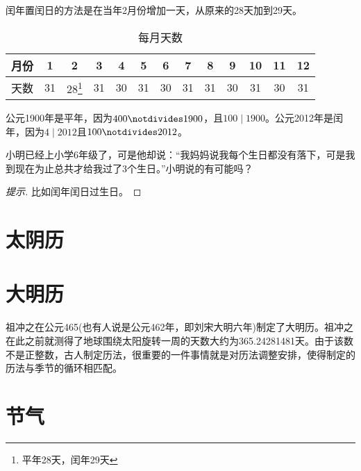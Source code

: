 闰年置闰日的方法是在当年2月份增加一天，从原来的28天加到29天。

\begin{table}[htbp]
  \centering
  \begin{minipage}{\textwidth}  %
  \begin{tabular}{ccccccccccccc}
    \toprule
    月份 & 1  & 2          & 3  & 4  & 5  & 6  & 7  & 8  & 9  & 10 & 11 & 12\\\midrule
    天数 & 31 & 28\footnote{平年28天，闰年29天} & 31 & 30 & 31 & 30 & 31 & 31 & 30 & 31 & 30 & 31\\
    \bottomrule
  \end{tabular}
  \end{minipage}
\caption{每月天数}
  \label{tab:days-of-months}
\end{table}

\begin{example}
  公元1900年是平年，因为$400\notdivides 1900$，且$100\mid 1900$。公元2012年是闰年，因为$4\mid 2012$且$100\notdivides 2012$。
\end{example}

\begin{example}
  小明已经上小学6年级了，可是他却说：“我妈妈说我每个生日都没有落下，可是我到现在为止总共才给我过了3个生日。”小明说的有可能吗？
\end{example}
\begin{proof}[提示]
  比如闰年闰日过生日。
\end{proof}

\section{太阴历}
\label{sec:tai-yin-calendar}



\section{大明历}
\label{sec:da-ming-calendar}

祖冲之在公元465(也有人说是公元462年，即刘宋大明六年)制定了大明历。祖冲之在此之前就测得了地球围绕太阳旋转一周的天数大约为365.24281481天。由于该数不是正整数，古人制定历法，很重要的一件事情就是对历法调整安排，使得制定的历法与季节的循环相匹配。

\section{节气}
\label{sec:jie-qi}

